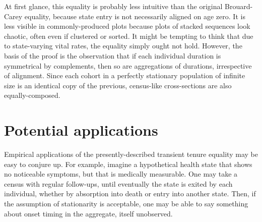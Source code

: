 \documentclass[12pt,oneside,a4paper]{article}
\theoremstyle{definition}
\begin{document}
At first glance, this equality is probably less intuitive than the
original Brouard-Carey equality, because state entry is not necessarily aligned
on age zero. It is less visible in commonly-produced plots because plots of
stacked sequences look chaotic, often even if clustered or sorted. It might
be tempting to think that due to state-varying vital rates, the equality simply ought not hold.
However, the basis of the proof is the observation that if each individual
duration is symmetrical by complements, then so are aggregations of
durations, irrespective of alignment. Since each cohort in a perfectly
stationary population of infinite size is an identical copy of the previous,
census-like cross-sections are also equally-composed.

\section{Potential applications}
Empirical applications of the presently-described transient tenure equality may
be easy to conjure up. For example, imagine a hypothetical health state that
shows no noticeable symptoms, but that is medically measurable. One
may take a census with regular follow-ups, until eventually the state is exited
by each individual, whether by absorption into death or entry into another
state. Then, if the assumption of stationarity is acceptable, one may be able to
say something about onset timing in the aggregate, itself unobserved. %
\end{document}
